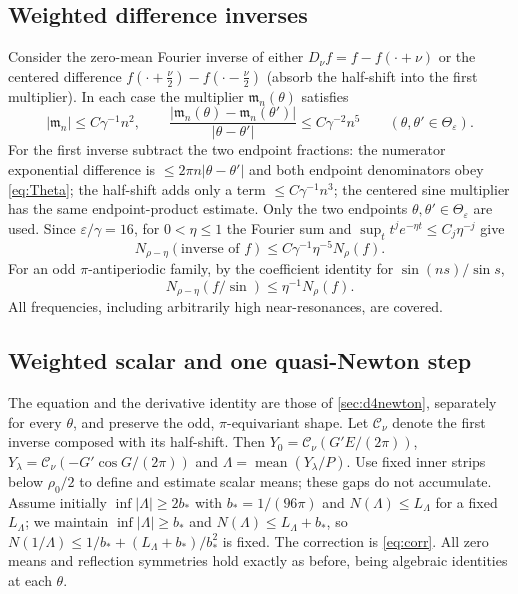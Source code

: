 \documentclass[11pt]{amsart}
\numberwithin{equation}{section}
\theoremstyle{definition}
\theoremstyle{remark}
\newcommand{\eps}{\varepsilon}
\newcommand{\abs}[1]{\lvert #1\rvert}
\newcommand{\mean}{\operatorname{mean}}
\begin{document}
\subsection{Weighted difference inverses}
Consider the zero-mean Fourier inverse of either $D_\nu f=f-f(\cdot+\nu)$ or the centered difference $f(\cdot+\frac\nu2)-f(\cdot-\frac\nu2)$ (absorb the half-shift into the first multiplier). In each case the multiplier $\mathfrak m_n(\theta)$ satisfies
\begin{equation}\label{eq:mult}
\abs{\mathfrak m_n}\le C\gamma^{-1}n^2,\qquad\frac{\abs{\mathfrak m_n(\theta)-\mathfrak m_n(\theta')}}{\abs{\theta-\theta'}}\le C\gamma^{-2}n^5\qquad(\theta,\theta'\in\Theta_\eps).
\end{equation}
For the first inverse subtract the two endpoint fractions: the numerator exponential difference is $\le2\pi n\abs{\theta-\theta'}$ and both endpoint denominators obey \eqref{eq:Theta}; the half-shift adds only a term $\le C\gamma^{-1}n^3$; the centered sine multiplier has the same endpoint-product estimate. Only the two endpoints $\theta,\theta'\in\Theta_\eps$ are used. Since $\eps/\gamma=16$, for $0<\eta\le1$ the Fourier sum and $\sup_tt^je^{-\eta t}\le C_j\eta^{-j}$ give
\begin{equation}\label{eq:wsum}
N_{\rho-\eta}(\text{inverse of }f)\le C\gamma^{-1}\eta^{-5}N_\rho(f).
\end{equation}
For an odd $\pi$-antiperiodic family, by the coefficient identity for $\sin(ns)/\sin s$,
\begin{equation}\label{eq:wsin}
N_{\rho-\eta}(f/\sin)\le\eta^{-1}N_\rho(f).
\end{equation}
All frequencies, including arbitrarily high near-resonances, are covered.

\subsection{Weighted scalar and one quasi-Newton step}
The equation and the derivative identity are those of \cref{sec:d4newton}, separately for every $\theta$, and preserve the odd, $\pi$-equivariant shape. Let $\mathcal C_\nu$ denote the first inverse composed with its half-shift. Then $Y_0=\mathcal C_\nu(G'E/(2\pi))$, $Y_\lambda=\mathcal C_\nu(-G'\cos G/(2\pi))$ and $\Lambda=\mean(Y_\lambda/P)$. Use fixed inner strips below $\rho_0/2$ to define and estimate scalar means; these gaps do not accumulate. Assume initially $\inf\abs\Lambda\ge2b_*$ with $b_*=1/(96\pi)$ and $N(\Lambda)\le L_\Lambda$ for a fixed $L_\Lambda$; we maintain $\inf\abs\Lambda\ge b_*$ and $N(\Lambda)\le L_\Lambda+b_*$, so $N(1/\Lambda)\le1/b_*+(L_\Lambda+b_*)/b_*^2$ is fixed. The correction is \eqref{eq:corr}. All zero means and reflection symmetries hold exactly as before, being algebraic identities at each $\theta$.
\end{document}
